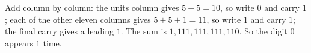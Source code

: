 Add column by column: the units column gives $5+5=10$, so write $0$ and carry $1$; each of the other eleven columns gives $5+5+1=11$, so write $1$ and carry $1$; the final carry gives a leading $1$. The sum is $1{,}111{,}111{,}111{,}110$. So the digit $0$ appears $\boxed{1}$ time.
